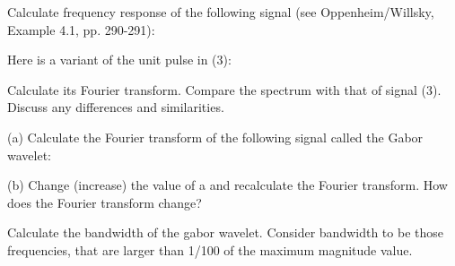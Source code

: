 \documentclass{article}
\begin{document}
\begin{CellGroup}
\begin{CellGroup}
Calculate frequency response of the following signal (see Oppenheim/Willsky, Example 4.1, pp. 290-291):


\end{CellGroup}
\begin{CellGroup}
Here is a variant of the unit pulse in (3):




 Calculate its Fourier transform. Compare the spectrum with that of signal (3). Discuss any differences and similarities.


\end{CellGroup}
\begin{CellGroup}
(a) Calculate the Fourier transform of the following signal called the Gabor wavelet:

\begin{CellGroup}

\end{CellGroup}
(b) Change (increase) the value of a and recalculate the Fourier transform. How does the Fourier transform change?


\end{CellGroup}
\begin{CellGroup}
Calculate the bandwidth of the gabor wavelet. Consider bandwidth to be those frequencies, that are larger than 1/100 of the maximum magnitude value.


\end{CellGroup}

\end{CellGroup}
\end{document}
